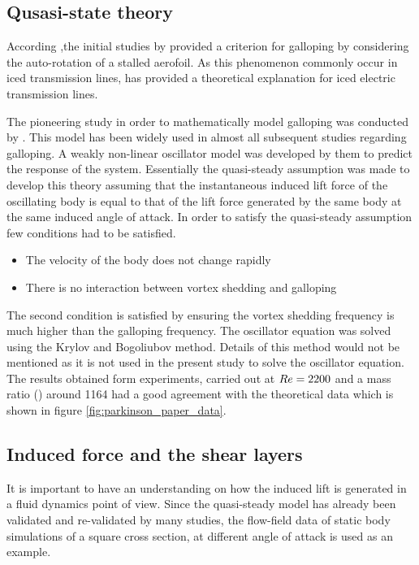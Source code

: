 \subsection{Qusasi-state theory}


According \cite{Paidoussis2010},the initial studies by \cite{Glauert1919} provided a criterion for galloping by considering the auto-rotation of a stalled aerofoil. As this phenomenon commonly occur in iced transmission lines, \cite{DenHartog1956} has provided a theoretical explanation for iced electric transmission lines. 

The pioneering study in order to mathematically model galloping was conducted by \cite{Parkinson1964}. This model has been widely used in almost all subsequent studies regarding galloping. A weakly non-linear oscillator model was developed by them to predict the response of the system. Essentially the quasi-steady assumption was made to develop this theory assuming that the instantaneous induced lift force of the oscillating body is equal to that of the lift force generated by the same body at the same induced angle of attack. In order to satisfy the quasi-steady assumption few conditions had to be satisfied.

\begin{itemize}
 \item The velocity of the body does not change rapidly
 \item There is no interaction between vortex shedding and galloping
\end{itemize}

The second condition is satisfied by ensuring the vortex shedding frequency is much higher than the galloping frequency.
The oscillator equation was solved using the Krylov and Bogoliubov method. Details of this method would not be mentioned as it is not used in the present study to solve the oscillator equation. The results obtained form experiments, carried out at $Re=2200$ and a mass ratio (\mstar) around 1164 had a good agreement with the theoretical data which is shown in figure \ref{fig:parkinson_paper_data}.



\subsection{Induced force and the shear layers}

It is important to have an understanding on how the induced lift is generated in a fluid dynamics point of view. Since the quasi-steady model has already been validated and re-validated by many studies, the flow-field data of static body simulations of a square cross section, at different angle of attack is used as an example. 












  


    

     










